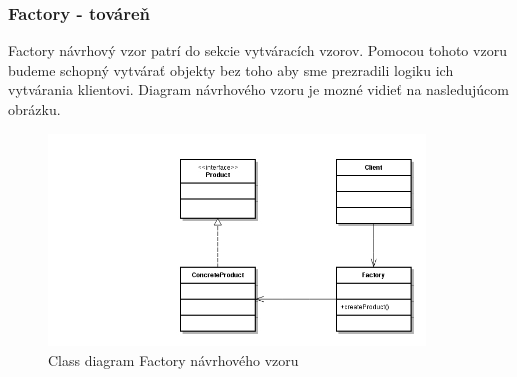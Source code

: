 \subsubsection{Factory - továreň}
\indent Factory návrhový vzor patrí do sekcie vytváracích vzorov. Pomocou tohoto vzoru budeme schopný vytvárať objekty bez toho aby sme prezradili logiku ich vytvárania klientovi.\cite{designpattern}
Diagram návrhového vzoru je mozné vidieť na nasledujúcom obrázku.
\begin{figure}[!htbp]
	\centering
	\includegraphics[width=10cm]{img/factory_design_pattern.jpg}
	\caption{Class diagram Factory návrhového vzoru}
	\label{fig:test}
\end{figure}
\newline
